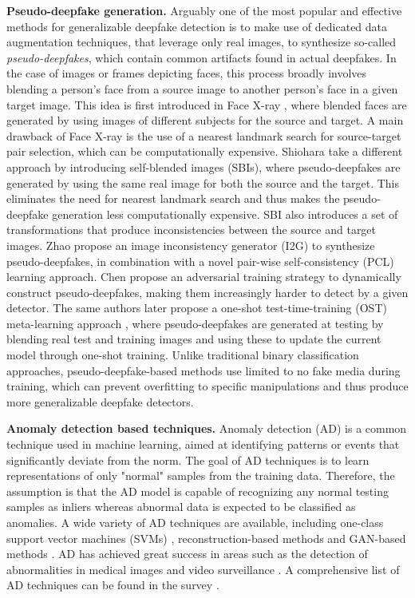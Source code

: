 \noindent\textbf{Pseudo-deepfake generation.} Arguably one of the most popular and effective methods for generalizable deepfake detection is to make use of dedicated data augmentation techniques, that leverage only real images, to synthesize so-called \textit{pseudo-deepfakes}, which contain common artifacts found in actual deepfakes. In the case of images or frames depicting faces, this process broadly involves blending a person's face from a source image to another person's face in a given target image. This idea is first introduced in Face X-ray \cite{li2020face_x_ray}, where blended faces are generated by using images of different subjects for the source and target. A main drawback of Face X-ray is the use of a nearest landmark search for source-target pair selection, which can be computationally expensive. Shiohara \etal \cite{shiohara2022detecting} take a different approach by introducing self-blended images (SBIs), where pseudo-deepfakes are generated by using the same real image for both the source and the target. This eliminates the need for nearest landmark search and thus makes the pseudo-deepfake generation less computationally expensive. SBI also introduces a set of transformations that produce inconsistencies between the source and target images. Zhao \etal \cite{zhao2021learning} propose an image inconsistency generator (I2G) to synthesize pseudo-deepfakes, in combination with a novel pair-wise self-consistency (PCL) learning approach. Chen \etal \cite{chen2022self_adversarial} propose an adversarial training strategy to dynamically construct pseudo-deepfakes, making them increasingly harder to detect by a given detector. The same authors later propose a one-shot test-time-training (OST) meta-learning approach \cite{chen2022ost}, where pseudo-deepfakes are generated at testing by blending real test and training images and using these to update the current model through one-shot training. Unlike traditional binary classification approaches, pseudo-deepfake-based methods use limited to no fake media during training, which can prevent overfitting to specific manipulations and thus produce more generalizable deepfake detectors.

\noindent\textbf{Anomaly detection based techniques.} Anomaly detection (AD) is a common technique used in machine learning, aimed at identifying patterns or events that significantly deviate from the norm. The goal of AD techniques is to learn representations of only "normal" samples from the training data. Therefore, the assumption is that the AD model is capable of recognizing any normal testing samples as inliers whereas abnormal data is expected to be classified as anomalies. A wide variety of AD techniques are available, including one-class support vector machines (SVMs) \cite{scholkopf1999one_class_svm}, reconstruction-based methods \cite{xia2015reconstruction_based} and GAN-based methods \cite{sabokrou2018adversarially}. AD has achieved great success in areas such as the detection of abnormalities in medical images \cite{baur2019deep_AD_MR} and video surveillance \cite{sultani2018real_video_surv}. A comprehensive list of AD techniques can be found in the survey \cite{yang2022visual}. 

